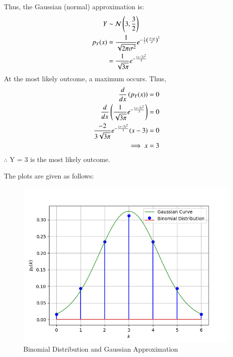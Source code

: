 \documentclass[journal,12pt,twocolumn]{IEEEtran}
\theoremstyle{remark}
\begin{document}
\begin{enumerate}
Thus, the Gaussian (normal) approximation is:
\begin{align}
    Y &\sim \mathcal{N}\left(3, \frac{3}{2}\right)\\
    p_Y(x) &= \frac{1}{\sqrt{2\pi\sigma^2}}e^{-\frac{1}{2} \left(\frac{x - \mu}{\sigma}\right)^2}\\
    &= \frac{1}{\sqrt{3\pi}}e^{-\frac{\left(x - 3\right)^2}{3}}
\end{align}
At the most likely outcome, a maximum occurs. Thus,
\begin{align}
    \frac{d}{dx}\left(p_Y(x)\right) &= 0\\
    \frac{d}{dx}\left(\frac{1}{\sqrt{3\pi}}e^{-\frac{\left(x - 3\right)^2}{3}}\right) &= 0\\
    \frac{-2}{3\sqrt{3\pi}}e^{-\frac{\left(x - 3\right)^2}{3}} (x-3) &= 0\\
    \implies x &= 3
\end{align}
$\therefore$ Y = 3 is the most likely outcome.
\end{enumerate}

The plots are given as follows:
\begin{figure}[h]
\centering
\includegraphics[width=\columnwidth]{figures/PDF_and_PMF.png}
\caption{Binomial Distribution and Gaussian Approximation}
\label{fig:9.3.19}
\end{figure}
\end{document}
